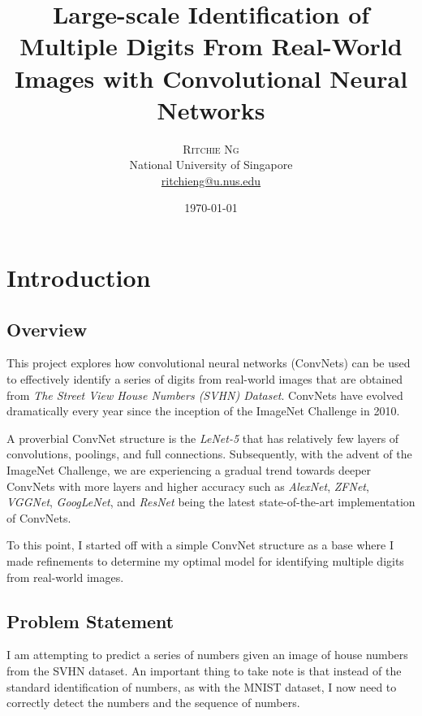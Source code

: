 \documentclass[twoside, column]{article}
\title{Large-scale Identification of Multiple Digits From Real-World Images with Convolutional Neural Networks}
\author{%
\textsc{Ritchie Ng}\\ 
\normalsize National University of Singapore\\ 
\normalsize \href{mailto:ritchieng@u.nus.edu}{ritchieng@u.nus.edu} 
}
\date{\today} %
\begin{document}
\maketitle


\section{Introduction}


\subsection{Overview}
This project explores how convolutional neural networks (ConvNets) can be used to effectively identify a series of digits from real-world images that are obtained from \textit{The Street View House Numbers (SVHN) Dataset}.  ConvNets have evolved dramatically every year since the inception of the ImageNet Challenge in 2010. 

A proverbial ConvNet structure is the \textit{LeNet-5} that has relatively few layers of convolutions, poolings, and full connections. Subsequently, with the advent of the ImageNet Challenge, we are experiencing a gradual trend towards deeper ConvNets with more layers and higher accuracy such as \textit{AlexNet}, \textit{ZFNet}, \textit{VGGNet}, \textit{GoogLeNet}, and \textit{ResNet} being the latest state-of-the-art implementation of ConvNets.  

To this point, I started off with a simple ConvNet structure as a base where I made refinements to determine my optimal model for identifying multiple digits from real-world images.


\subsection{Problem Statement}
I am attempting to predict a series of numbers given an image of house numbers from the SVHN dataset. An important thing to take note is that instead of the standard identification of numbers, as with the MNIST dataset, I now need to correctly detect the numbers and the sequence of numbers. 
\end{document}
